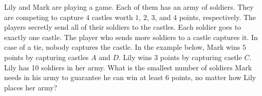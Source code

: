 Lily and Mark are playing a game. Each of them has an army of soldiers. They are competing to capture $4$ castles worth $1$, $2$, $3$, and $4$ points, respectively. The players secretly send all of their soldiers to the castles. Each soldier goes to exactly one castle. The player who sends more soldiers to a castle captures it. In case of a tie, nobody captures the castle. In the example below, Mark wins $5$ points by capturing castles $A$ and $D$. Lily wins $3$ points by capturing castle $C$. Lily has 10 soldiers in her army. What is the smallest number of soldiers Mark needs in his army to guarantee he can win at least $6$ points, no matter how Lily places her army?
